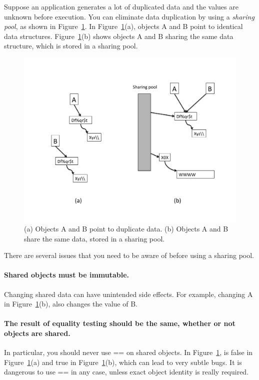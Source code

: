 Suppose an application generates a lot of duplicated data and the values
are unknown before execution. 
You can eliminate data duplication by using a \emph{sharing pool}, as shown
in Figure~\ref{fig:sharing-pool}. In Figure~\ref{fig:sharing-pool}(a), objects
A and B point to identical data structures.
Figure~\ref{fig:sharing-pool}(b) shows objects A and B sharing the same data
structure, which is stored in a sharing pool.
 \begin{figure}
  \centering
 \includegraphics[width=.80\textwidth]{part1/Figures/modelingdatatypes/sharing-pool.pdf}
  \caption{(a) Objects A and B point to duplicate data. (b) Objects A and B
  share the same data, stored in a sharing pool.}
  \label{fig:sharing-pool}
\end{figure}


There are several issues that you need to be aware of before using a sharing
pool.
\paragraph{Shared objects must be immutable.} Changing shared data can
have unintended side effects. For example, 
changing A in Figure~\ref{fig:sharing-pool}(b), 
also changes the value of B.

\paragraph{The result of equality testing should be the same, whether or
not objects are shared.}
 In particular, you should never use == on shared objects.
In Figure~\ref{fig:sharing-pool},  is false in
Figure~\ref{fig:sharing-pool}(a) and true in Figure~\ref{fig:sharing-pool}(b),
 which can lead to very subtle bugs. It is dangerous to use == in any case,
 unless exact object identity is really required.
 

